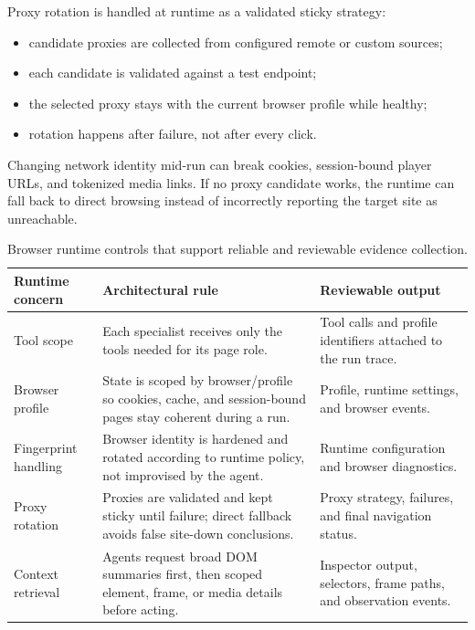 Proxy rotation is handled at runtime as a validated sticky strategy:
\begin{itemize}
  \item candidate proxies are collected from configured remote or custom sources;
  \item each candidate is validated against a test endpoint;
  \item the selected proxy stays with the current browser profile while healthy;
  \item rotation happens after failure, not after every click.
\end{itemize}

Changing network identity mid-run can break cookies, session-bound player URLs, and
tokenized media links. If no proxy candidate works, the runtime can fall back to
direct browsing instead of incorrectly reporting the target site as unreachable.



\begin{table}[!htbp]
\centering
\begin{tabularx}{\textwidth}{Q{3.2cm} Y Y}
\toprule
{}
Runtime concern & Architectural rule & Reviewable output \\
\midrule
Tool scope & Each specialist receives only the tools needed for its page role. &
Tool calls and profile identifiers attached to the run trace. \\
Browser profile & State is scoped by browser/profile so cookies, cache, and
session-bound pages stay coherent during a run. & Profile, runtime settings, and
browser events. \\
Fingerprint handling & Browser identity is hardened and rotated according to
runtime policy, not improvised by the agent. & Runtime configuration and browser
diagnostics. \\
Proxy rotation & Proxies are validated and kept sticky until failure; direct
fallback avoids false site-down conclusions. & Proxy strategy, failures, and final
navigation status. \\
Context retrieval & Agents request broad DOM summaries first, then scoped element,
frame, or media details before acting. & Inspector output, selectors, frame paths,
and observation events. \\
\bottomrule
\end{tabularx}
\caption{Browser runtime controls that support reliable and reviewable evidence collection.}\label{tab:browser-runtime-controls}
\end{table}

